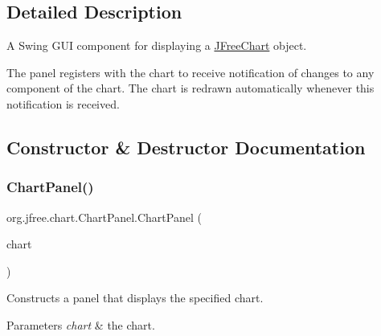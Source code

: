 \subsection{Detailed Description}
A Swing G\+UI component for displaying a \mbox{\hyperlink{classorg_1_1jfree_1_1chart_1_1_j_free_chart}{J\+Free\+Chart}} object. 

The panel registers with the chart to receive notification of changes to any component of the chart. The chart is redrawn automatically whenever this notification is received. 

\subsection{Constructor \& Destructor Documentation}
\mbox{\label{classorg_1_1jfree_1_1chart_1_1_chart_panel_afe98d95369c1544590392fc33db8ae30}} 
\subsubsection{\texorpdfstring{Chart\+Panel()}{ChartPanel()}\hspace{0.1cm}{\footnotesize\ttfamily [1/5]}}
{\footnotesize\ttfamily org.\+jfree.\+chart.\+Chart\+Panel.\+Chart\+Panel (\begin{DoxyParamCaption}\item[{\mbox{\hyperlink{classorg_1_1jfree_1_1chart_1_1_j_free_chart}{J\+Free\+Chart}}}]{chart }\end{DoxyParamCaption})}

Constructs a panel that displays the specified chart.


\begin{DoxyParams}{Parameters}
{\em chart} & the chart. \\
\hline
\end{DoxyParams}
\mbox{\label{classorg_1_1jfree_1_1chart_1_1_chart_panel_af6a83f80e906f5d3383280ca8689bf34}} 
